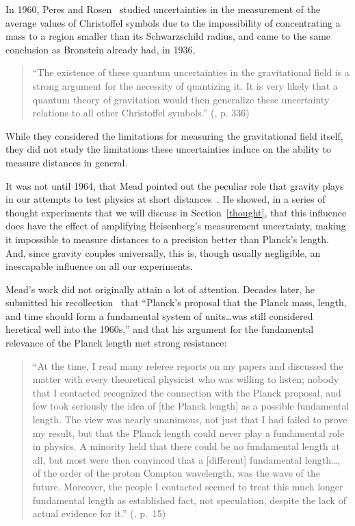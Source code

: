 \documentclass{article}
\begin{document}
In 1960, Peres and Rosen~\cite{Peres:1960zz} studied uncertainties in
the measurement of the average values of Christoffel symbols due to
the impossibility of concentrating a mass to a region smaller than its
Schwarzschild radius, and came to the same conclusion as Bronstein
already had, in 1936,
%
\begin{quote}
``The existence of these quantum uncertainties in the gravitational
  field is a strong argument for the necessity of quantizing it. It is
  very likely that a quantum theory of gravitation would then
  generalize these uncertainty relations to all other Christoffel
  symbols.'' (\cite{Peres:1960zz}, p. 336)
\end{quote}
%
While they considered the limitations for measuring the gravitational field itself, they did not study the limitations
these uncertainties induce on the ability to measure distances in general. 

It was not until 1964, that Mead pointed out the peculiar role that gravity plays in our
attempts to test physics at short distances~\cite{Mead,Mead1}. He showed, in a series of thought
experiments that we will discuss in Section~\ref{thought}, that this influence does
have the effect of amplifying Heisenberg's measurement uncertainty, making it impossible
to measure distances to a precision better than Planck's length. And, since gravity couples universally, this
is, though usually negligible, an inescapable influence on all our experiments. 

Mead's work did not originally attain a lot of attention. Decades
later, he submitted his recollection~\cite{Mead2} that ``Planck's
proposal that the Planck mass, length, and time should form a
fundamental system of units\ldots was still considered heretical well
into the 1960s,'' and that his argument for the fundamental relevance
of the Planck length met strong resistance:
%
\begin{quote}
``At the time, I read many referee reports on my papers and discussed
  the matter with every theoretical physicist who was willing to
  listen; nobody that I contacted recognized the connection with the
  Planck proposal, and few took seriously the idea of [the Planck
    length] as a possible fundamental length. The view was nearly
  unanimous, not just that I had failed to prove my result, but that
  the Planck length could never play a fundamental role in physics. A
  minority held that there could be no fundamental length at all, but
  most were then convinced that a [different] fundamental
  length\ldots, of the order of the proton Compton wavelength, was the
  wave of the future. Moreover, the people I contacted seemed to treat
  this much longer fundamental length as established fact, not
  speculation, despite the lack of actual evidence for it.''
  (\cite{Mead2}, p.~15)
\end{quote}
\end{document}
